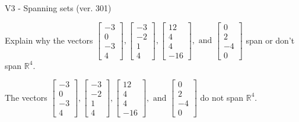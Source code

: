 \begin{exercise}
  \begin{exerciseTitle}V3 - Spanning sets (ver. 301)\end{exerciseTitle}
  \begin{exerciseStatement}
    Explain why the vectors \(\left[\begin{array}{r}
-3 \\
0 \\
-3 \\
4
\end{array}\right] , \left[\begin{array}{r}
-3 \\
-2 \\
1 \\
4
\end{array}\right] , \left[\begin{array}{r}
12 \\
4 \\
4 \\
-16
\end{array}\right] , \text{ and } \left[\begin{array}{r}
0 \\
2 \\
-4 \\
0
\end{array}\right]\) span or don't span \(\mathbb{R}^4\). 
	


  \end{exerciseStatement}
  \begin{exerciseAnswer}
   The vectors \(\left[\begin{array}{r}
-3 \\
0 \\
-3 \\
4
\end{array}\right] , \left[\begin{array}{r}
-3 \\
-2 \\
1 \\
4
\end{array}\right] , \left[\begin{array}{r}
12 \\
4 \\
4 \\
-16
\end{array}\right] , \text{ and } \left[\begin{array}{r}
0 \\
2 \\
-4 \\
0
\end{array}\right]\) 
  	 do not  
	span \(\mathbb{R}^4\).
  


  \end{exerciseAnswer}
\end{exercise}